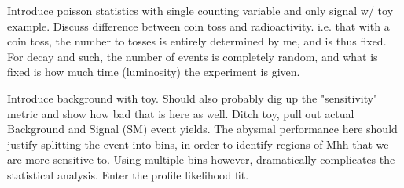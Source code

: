     
    Introduce poisson statistics with single counting variable and only signal w/ toy example.
    Discuss difference between coin toss and radioactivity.
    i.e. that with a coin toss, the number to tosses is entirely determined by me, and is thus fixed.
    For decay and such, the number of events is completely random, and what is fixed is how much time (luminosity)
        the experiment is given.

    Introduce background with toy.
    Should also probably dig up the "sensitivity" metric and show how bad that is here as well.
    Ditch toy, pull out actual Background and Signal (SM) event yields.
    The abysmal performance here should justify splitting the event into bins,
        in order to identify regions of Mhh that we are more sensitive to.
    Using multiple bins however, dramatically complicates the statistical analysis.
    Enter the profile likelihood fit.


